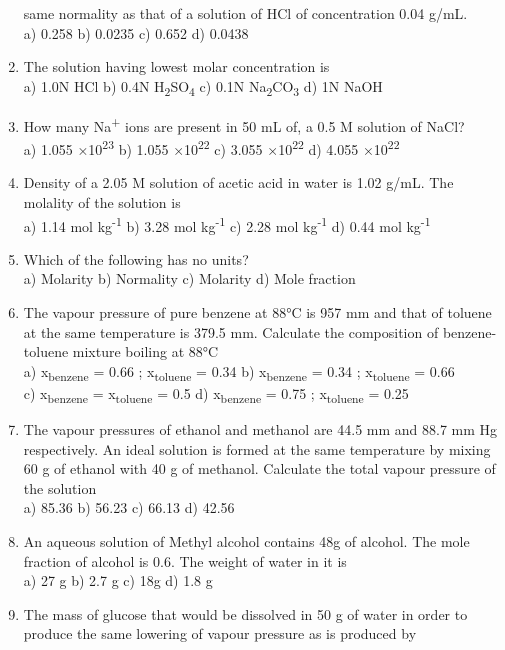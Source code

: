 \begin{enumerate}
  same normality as that of a solution of HCl of concentration 0.04
  g/mL.\\
  a) 0.258 b) 0.0235 c) 0.652 d) 0.0438
\item
  The solution having lowest molar concentration is\\
  a) 1.0N HCl b) 0.4N H\textsubscript{2}SO\textsubscript{4} c) 0.1N
  Na\textsubscript{2}CO\textsubscript{3} d) 1N NaOH
\item
  How many Na\textsuperscript{+} ions are present in 50 mL of, a 0.5 M
  solution of NaCl?\\
  a) 1.055 ×10\textsuperscript{23} b) 1.055 ×10\textsuperscript{22} c)
  3.055 ×10\textsuperscript{22} d) 4.055 ×10\textsuperscript{22}
\item
  Density of a 2.05 M solution of acetic acid in water is 1.02 g/mL. The
  molality of the solution is\\
  a) 1.14 mol kg\textsuperscript{-1} b) 3.28 mol kg\textsuperscript{-1}
  c) 2.28 mol kg\textsuperscript{-1} d) 0.44 mol kg\textsuperscript{-1}
\item
  Which of the following has no units?\\
  a) Molarity b) Normality c) Molarity d) Mole fraction
\item
  The vapour pressure of pure benzene at 88°C is 957 mm and that of
  toluene at the same temperature is 379.5 mm. Calculate the composition
  of benzene-toluene mixture boiling at 88°C\\
  a) x\textsubscript{benzene} = 0.66 ; x\textsubscript{toluene} = 0.34
  b) x\textsubscript{benzene} = 0.34 ; x\textsubscript{toluene} = 0.66\\
  c) x\textsubscript{benzene} = x\textsubscript{toluene} = 0.5 d)
  x\textsubscript{benzene} = 0.75 ; x\textsubscript{toluene} = 0.25
\item
  The vapour pressures of ethanol and methanol are 44.5 mm and 88.7 mm
  Hg respectively. An ideal solution is formed at the same temperature
  by mixing 60 g of ethanol with 40 g of methanol. Calculate the total
  vapour pressure of the solution\\
  a) 85.36 b) 56.23 c) 66.13 d) 42.56
\item
  An aqueous solution of Methyl alcohol contains 48g of alcohol. The
  mole fraction of alcohol is 0.6. The weight of water in it is\\
  a) 27 g b) 2.7 g c) 18g d) 1.8 g
\item
  The mass of glucose that would be dissolved in 50 g of water in order
  to produce the same lowering of vapour pressure as is produced by

\end{enumerate}
